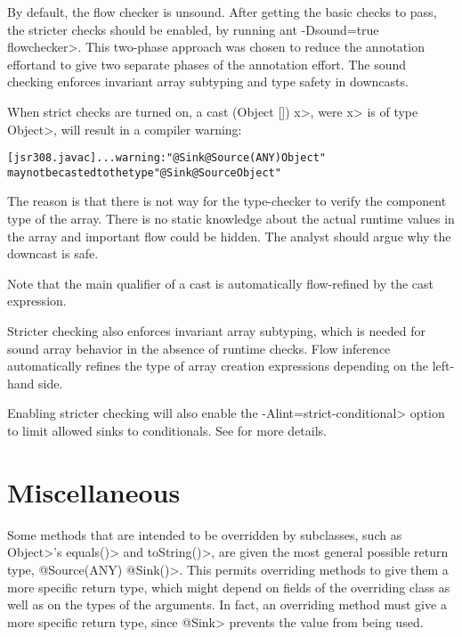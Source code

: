 By default, the flow checker is unsound.  After getting the basic checks to pass, the
 stricter checks should be enabled, by running \<ant -Dsound=true flowchecker>.
This two-phase approach was chosen to reduce
the annotation effortand to give two separate phases of
the annotation effort.
 The sound checking enforces invariant 
array subtyping and type safety in downcasts.


When strict checks are turned on,
a cast \<(Object []) x>, were \<x> is of type \<Object>, will result
in a compiler warning:

\begin{alltt}
[jsr308.javac] ... warning: "@Sink @Source({ANY}) Object"
       may not be casted to the type "@Sink @Source Object"
\end{alltt}

The reason is that there is not way for the type-checker to verify
 the component type of the array. There is no static knowledge about the actual
runtime values in the array and important flow could be hidden.
The analyst should argue why the downcast is safe.

Note that the main qualifier of a cast is automatically flow-refined
by the cast expression.


\medskip

Stricter checking also enforces invariant array subtyping, which is
needed for sound array behavior in the absence of runtime checks.
Flow inference automatically refines the type of array creation
expressions depending on the left-hand side.

\medskip

Enabling stricter checking will also enable the \<-Alint=strict-conditional> option to limit 
allowed sinks to conditionals. See  for more details.

\section{Miscellaneous\label{sec:miscellaneous}}

Some methods that are intended to be overridden by subclasses, such as 
\<Object>'s \<equals()> and \<toString()>, are given the most general
possible return type, \<@Source(ANY) @Sink({})>.
This permits overriding methods to give them a more specific return type, which
might depend on fields of the overriding class as well as on the types of
the arguments.  In fact, an overriding method must give a more specific
return type, since \<@Sink> prevents the value from being used.

